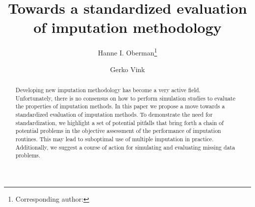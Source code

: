 \documentclass[bimj,fleqn]{w-art}
\theoremstyle{plain}
\theoremstyle{definition}
\begin{document}
\keywords{Evaluation; Imputation; Missing data; Simulation studies;\\ [1pc]
\noindent \hspace*{-4pc} Supporting Information for this article is available online from \\
\hspace*{-4pc} \underline{github.com/gerkovink/StandardizedEvaluation}. 
}  %

\title[Standardized evaluation]{Towards a standardized evaluation of imputation methodology}
\author[Oberman]{Hanne I. Oberman\footnote{Corresponding author: {}}} 
\address[\inst{1}]{Departement of Methodology \& Statistics, Padualaan 14, 3584 CH Utrecht, The Netherlands}
\author[Vink]{Gerko Vink}
   

\begin{abstract}
Developing new imputation methodology has become a very active field. Unfortunately, there is no consensus on how to perform simulation studies to evaluate the properties of imputation methods. In this paper we propose a move towards a standardized evaluation of imputation methods. To demonstrate the need for standardization, we highlight a set of potential pitfalls that bring forth a chain of potential problems in the objective assessment of the performance of imputation routines. This may lead to suboptimal use of multiple imputation in practice. Additionally, we suggest a course of action for simulating and evaluating missing data problems.
\end{abstract}



\maketitle          %
\end{document}
